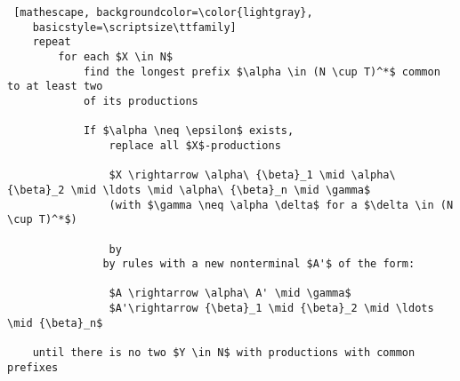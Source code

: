\documentclass[
    border=0.2cm,
    convert={density=600}
]{standalone}
\begin{document}
\begin{lstlisting} [mathescape, backgroundcolor=\color{lightgray},
	basicstyle=\scriptsize\ttfamily]
	repeat
	    for each $X \in N$ 
	        find the longest prefix $\alpha \in (N \cup T)^*$ common to at least two 
	        of its productions
	
	        If $\alpha \neq \epsilon$ exists, 
	            replace all $X$-productions
	
	            $X \rightarrow \alpha\ {\beta}_1 \mid \alpha\ {\beta}_2 \mid \ldots \mid \alpha\ {\beta}_n \mid \gamma$ 
	            (with $\gamma \neq \alpha \delta$ for a $\delta \in (N \cup T)^*$)
	            
	            by  
	           by rules with a new nonterminal $A'$ of the form:
	
              	$A \rightarrow \alpha\ A' \mid \gamma$
	            $A'\rightarrow {\beta}_1 \mid {\beta}_2 \mid \ldots \mid {\beta}_n$
	
    until there is no two $Y \in N$ with productions with common prefixes
\end{lstlisting}
\end{document}

